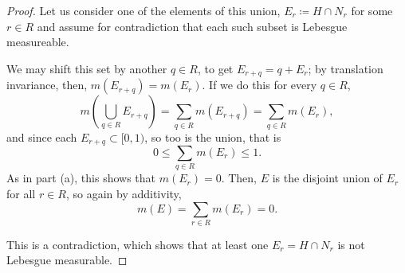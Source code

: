 \documentclass[12pt]{article}
\newenvironment{problem}[2][Problem]{\begin{trivlist}
    \item[\hskip \labelsep {\bfseries #1}\hskip \labelsep {\bfseries #2.}]}{\end{trivlist}}
\theoremstyle{definition}
\begin{document}
\begin{problem}{1.5.29}
\begin{enumerate}[label=(\alph*)]
\begin{proof}
          Let us consider one of the elements of this union, \( E_r \coloneq H \cap N_r \) for some \( r \in R \) and assume for contradiction that each such subset is Lebesgue measureable.

          We may shift this set by another \( q \in R \), to get \( E_{r+q} = q + E_r \); by translation invariance, then, \( m(E_{r+q}) = m(E_r) \).
          If we do this for every \( q \in R \),
          \begin{equation}
          \label{eq:12}
          m(\bigcup_{q \in R} E_{r+q}) = \sum\limits_{q \in R} m(E_{r+q}) = \sum\limits_{q \in R} m(E_r),
          \end{equation}
          and since each \( E_{r+q} \subset [0,1) \), so too is the union, that is
          \begin{equation}
          \label{eq:13}
          0 \leq \sum\limits_{q \in R} m(E_r) \leq 1.
          \end{equation}
          As in part (a), this shows that \( m(E_r) = 0 \).
          Then, \( E \) is the disjoint union of \( E_r \) for all \( r \in R \), so again by additivity,
          \begin{equation}
          \label{eq:14}
          m(E) = \sum\limits_{r \in R} m(E_r) = 0.
          \end{equation}

          This is a contradiction, which shows that at least one \( E_r = H \cap N_r \) is not Lebesgue measurable.
          \end{proof}
  \end{enumerate}
\end{problem}
\end{document}
